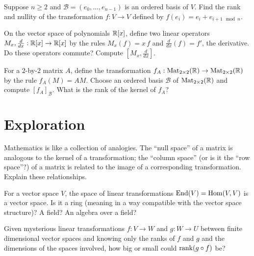 \documentclass{homework}
\begin{document}
\begin{problem}
  Suppose $n \geq 2$ and $\mathcal{B} = (e_0,\ldots,e_{n-1})$ is an ordered basis of $V$.  Find the rank and nullity of the transformation $f : V \to V$ defined by $f(e_i) = e_i + e_{i+1 \mod n}$.
\end{problem}

\begin{problem}
  On the vector space of polynomials $\mathbb{R}[x]$, define two linear operators $M_x, \frac{d}{dx} : \mathbb{R}[x] \to \mathbb{R}[x]$ by the rules $M_x(f) = x \, f$ and $\frac{d}{dx}(f) = f'$, the derivative.  Do these operators commute?  Compute $[M_x,\frac{d}{dx}]$.
\end{problem}

\begin{problem}
  For a $2$-by-$2$ matrix $A$, define the transformation
  $f_A : \operatorname{Mat}_{2\times 2}(\mathbb{R}) \to \operatorname{Mat}_{2\times 2}(\mathbb{R})$ by the rule
  $f_A(M) = AM$.  Choose an ordered basis
  $\mathcal{B}$ of $\operatorname{Mat}_{2\times 2}(\mathbb{R})$ and compute
  $[f_A]_{\mathcal{B}}$.  What is the rank of the kernel of $f_A$?
\end{problem}

\section{Exploration}

\begin{problem}
  Mathematics is like a collection of analogies.  The ``null space''
  of a matrix is analogous to the kernel of a transformation; the
  ``column space'' (or is it the ``row space''?) of a matrix is
  related to the image of a corresponding transformation.  Explain these relationships.
\end{problem}

\begin{problem}
  For a vector space $V$, the space of linear transformations
  $\operatorname{End}(V) = \operatorname{Hom}(V,V)$ is a vector space.  Is it a ring (meaning in a
  way compatible with the vector space structure)?  A field?  An
  algebra over a field?
\end{problem}

\begin{problem}
  Given mysterious linear transformations $f : V \to W$ and
  $g : W \to U$ between finite dimensional vector spaces and knowing
  only the ranks of $f$ and $g$ and the dimensions of the spaces
  involved, how big or small could $\operatorname{rank} (g \circ f)$ be?
\end{problem}
\end{document}
